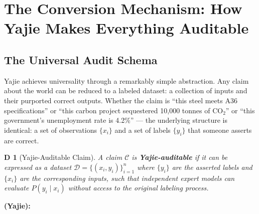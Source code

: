 \documentclass[12pt,a4paper]{article}
\newtheorem{definition}[theorem]Definition
\theoremstyle{remark}
\begin{document}
\section{The Conversion Mechanism: How Yajie Makes Everything Auditable}
\subsection{The Universal Audit Schema}
Yajie achieves universality through a remarkably simple abstraction. Any claim about the 
world can be reduced to a labeled dataset: a collection of inputs and their purported 
correct outputs. Whether the claim is ``this steel meets A36 specifications'' or ``this 
carbon project sequestered 10,000 tonnes of CO$_2$'' or ``this government's unemployment 
rate is 4.2\%'' --- the underlying structure is identical: a set of observations $\{x_i\}$ 
and a set of labels $\{y_i\}$ that someone asserts are correct.
\begin{definition}[Yajie-Auditable Claim]
A claim $\mathcal{C}$ is \textbf{Yajie-auditable} if it can be expressed as a dataset 
$\mathcal{D} = \{(x_i, y_i)\}_{i=1}^n$ where $\{y_i\}$ are the asserted labels and 
$\{x_i\}$ are the corresponding inputs, such that independent expert models can 
evaluate $P(y_i \mid x_i)$ without access to the original labeling process.
\end{definition}
\medskip
\textbf{(Yajie): }
\end{document}
